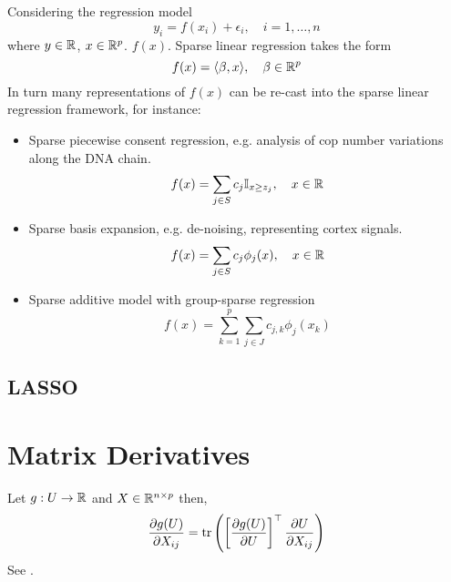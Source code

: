 \documentclass[12pt]{article}
\begin{document}
\subsection{}
Considering the regression model
\begin{equation}
y_i = f(x_i) + \epsilon_i, \quad i=1,\dots,n
\end{equation}
where $y \in \mathbb{R}$, $x \in \mathbb{R}^p$. $f(x)$. 
Sparse linear regression takes the form
\begin{equation}
    f(x) = \langle \beta, x \rangle, \quad \beta \in \mathbb{R}^p
\end{equation}
In turn many representations of $f(x)$ can be re-cast into the sparse linear regression framework, for instance:
\begin{itemize}
    \item Sparse piecewise consent regression, e.g. analysis of cop number variations along the DNA chain.
    \begin{equation}
	f(x) = \sum_{j \in S} c_j \mathbb{I}_{x \geq z_j},\quad x \in \mathbb{R}
    \end{equation}
    \item Sparse basis expansion, e.g. de-noising, representing cortex signals.
    \begin{equation}
	f(x) = \sum_{j \in S} c_j \phi_j(x), \quad x \in \mathbb{R}
    \end{equation}
    \item Sparse additive model with group-sparse regression
    \begin{equation}
	f(x) = \sum_{k=1}^{p} \sum_{j \in J}^{} c_{j, k} \phi_j (x_k)
    \end{equation}
\end{itemize}





\subsection{LASSO}

\citep{Giraud2021}


\newpage


\appendix

\section{Matrix Derivatives}

Let $g: U \rightarrow \mathbb{R}$ and $X \in \mathbb{R}^{n \times p}$ then,
\begin{equation} \label{eq:matrix_chain_rule}
    \frac{\partial g(U)}{\partial X_{ij}} = \operatorname{tr} \left( 
	\left[ \frac{\partial g(U)}{\partial U} \right]^\top
	 \frac{\partial U}{\partial X_{ij}} \right)
\end{equation}
See \citep[Sec 2.8.1]{MCB}.
\end{document}
